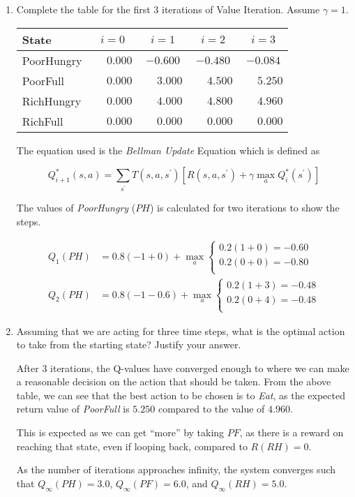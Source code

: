 \documentclass[12pt]{article}
\begin{document}
\newpage
\begin{enumerate}

\item Complete the table for the first 3 iterations of Value
  Iteration. Assume $\gamma = 1$.

\begin{center}
\begin{tabular}{|l|c|c|c|c|} \hline
State      & $i=0$ & $i=1$ & $i=2$ & $i=3$ \\ \hline \hline
PoorHungry &$\phantom{-}0.000$&$-0.600$&$-0.480$&$-0.084$\\ \hline
PoorFull   &$\phantom{-}0.000$&$\phantom{-}3.000$&$\phantom{-}4.500$&$\phantom{-}5.250$\\ \hline
RichHungry &$\phantom{-}0.000$&$\phantom{-}4.000$&$\phantom{-}4.800$&$\phantom{-}4.960$\\ \hline
RichFull   &$\phantom{-}0.000$&$\phantom{-}0.000$&$\phantom{-}0.000$&$\phantom{-}0.000$\\ \hline
\end{tabular}
\end{center}

The equation used is the {\em Bellman Update} Equation which is defined as

\[
   Q_{i+1}^{*}(s,a) = \sum_{s^{\prime}}T(s, a, s^{\prime})\left[ R(s, a, s^{\prime}) + \gamma\max_{a}Q^{*}_{i}(s^{\prime})\right]
\]

The values of {\em PoorHungry} ($PH$) is calculated for two iterations to show the steps.

\begin{align*}
Q_{1}(PH) &= 0.8(-1 + 0) + \max_{a}\left\{ \begin{array}{l} 0.2(1 + 0) = -0.60\\ 0.2(0 + 0) = -0.80\\\end{array}\right.\\
Q_{2}(PH) &= 0.8(-1 - 0.6) + \max_{a}\left\{ \begin{array}{l} 0.2(1 + 3) = -0.48\\ 0.2(0 + 4) = -0.48\\\end{array}\right.
\end{align*}

\item Assuming that we are acting for three time steps, what is the
  optimal action to take from the starting state? Justify your answer.

After 3 iterations, the Q-values have converged enough to where we can make a reasonable decision on the action that should be taken. From the above table, we can see that the best action to be chosen is to {\em Eat}, as the expected return value of {\em PoorFull} is $5.250$ compared to the value of $4.960$. 

This is expected as we can get ``more'' by taking $PF$, as there is a reward on reaching that state, even if looping back, compared to $R(RH) = 0$. 

As the number of iterations approaches infinity, the system converges such that $Q_{\infty}(PH) = 3.0$, $Q_{\infty}(PF) = 6.0$, and $Q_{\infty}(RH) = 5.0$. 
\end{enumerate}
\end{document}
